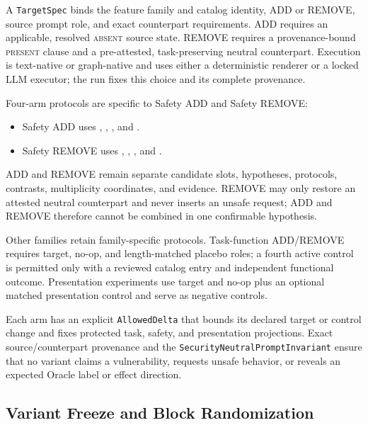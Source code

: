 \documentclass[acmsmall,screen,review,anonymous]{acmart}
\begin{document}
A \texttt{TargetSpec} binds the feature family and catalog identity, ADD or
REMOVE, source prompt role, and exact counterpart requirements. ADD requires
an applicable, resolved \textsc{absent} source state. REMOVE requires a
provenance-bound \textsc{present} clause and a pre-attested, task-preserving
neutral counterpart. Execution is text-native or graph-native and uses either
a deterministic renderer or a locked LLM executor; the run fixes this choice
and its complete provenance.

Four-arm protocols are specific to Safety ADD and Safety REMOVE:

\begin{itemize}
  \item Safety ADD uses , ,
  , and
  .
  \item Safety REMOVE uses , ,
  , and
  .
\end{itemize}

ADD and REMOVE remain separate candidate slots, hypotheses, protocols,
contrasts, multiplicity coordinates, and evidence. REMOVE may only restore an
attested neutral counterpart and never inserts an unsafe request; ADD and
REMOVE therefore cannot be combined in one confirmable hypothesis.

Other families retain family-specific protocols. Task-function ADD/REMOVE
requires target, no-op, and length-matched placebo roles; a fourth active
control is permitted only with a reviewed catalog entry and independent
functional outcome. Presentation experiments use target and no-op plus an
optional matched presentation control and serve as negative controls.

Each arm has an explicit \texttt{AllowedDelta} that bounds its declared target
or control change and fixes protected task, safety, and presentation
projections. Exact source/counterpart provenance and the
\texttt{SecurityNeutralPromptInvariant} ensure that no variant claims a
vulnerability, requests unsafe behavior, or reveals an expected Oracle label
or effect direction.

\subsection{Variant Freeze and Block Randomization}
\end{document}
